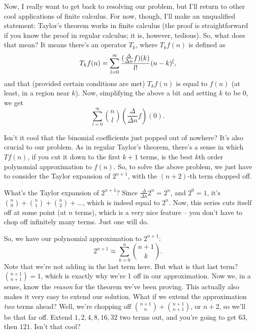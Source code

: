 \documentclass[12pt,letterpaper]{article}
\begin{document}
Now, I really want to get back to resolving our problem, but I'll
return to other cool applications of finite calculus. For now,
though, I'll make an unqualified statement: Taylor's theorem works in
finite calculus (the proof is straightforward if you know the proof
in regular calculus; it is, however, tedious). So, what does that
mean? It means there's an operator $T_k$, where $T_k f(n)$ is defined as
$$T_k f(n) = \sum_{l=0}^{\infty} \frac{(\frac{\Delta}{\Delta n} f)(k)}{l!}
(n-k)^{\uline l},$$ and that (provided certain conditions are met) $T_k f(n)$
is equal to $f(n)$ (at least, in a region near $k$). Now, simplifying
the above a bit and setting $k$ to be 0, we get $$\sum_{l=0}^\infty
\binom{n}{l} \left(\frac{\Delta}{\Delta n} f\right)(0).$$

Isn't it cool that the binomial coefficients just popped out of
nowhere? It's also crucial to our problem. As in regular Taylor's
theorem, there's a sense in which $T f(n)$, if you cut it down to the
first $k+1$ terms, is the best $k$th order polynomial approximation
to $f(n)$. So, to solve the above problem, we just have to consider
the Taylor expansion of $2^{n+1}$, with the $(n+2)$-th term chopped off.

What's the Taylor expansion of $2^{n+1}$? Since $\frac{\Delta}{\Delta
n} 2^n = 2^n$, and $2^0 = 1$, it's $\binom{n}{0} + \binom{n}{1} +
\binom{n}{2} + \ldots$, which is indeed equal to $2^n$. Now, this
series cuts itself off at some
point (at $n$ terms), which is a very nice feature -- you don't have
to chop off infinitely many terms. Just one will do.

So, we have our polynomial approximation to $2^{n+1}$:
$$2^{n+1} \approx \sum_{k=0}^{n} \binom{n+1}{k}.$$ Note that we're not adding in the
last term here. But what is that last term? $\binom{n+1}{n+1} = 1$,
which is exactly why we're 1 off in our approximation. Now we, in a
sense, know the \emph{reason} for the theorem we've been proving. This
actually also makes it very easy to extend our solution. What if we
extend the approximation \emph{two} terms ahead? Well, we're chopping
off $\binom{n+1}{n} + \binom{n+1}{n+1}$, or $n+2$, so we'll be that
far off. Extend $1, 2, 4, 8, 16, 32$ two terms out, and you're
going to get $63$, then $121$. Isn't that cool?
\end{document}
